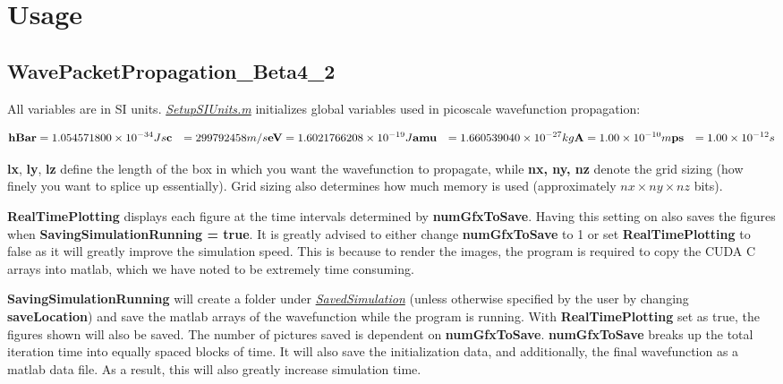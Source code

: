\documentclass[11pt,letterpaper]{article}
\renewcommand{\\}{\bigskip}
\begin{document}
\section{Usage}

\subsection{WavePacketPropagation\_Beta4\_2} 

All variables are in SI units. \underline{\textit{SetupSIUnits.m}} initializes global variables used in picoscale wavefunction propagation:

\begin{align*}
    \textbf{hBar} &= 1.054571800 \times 10^{-34} Js\\
    \textbf{c} &= 299792458 m/s\\
    \textbf{eV} &= 1.6021766208 \times 10^{-19} J\\
    \textbf{amu} &=  1.660539040 \times 10^{-27} kg\\
    \textbf{A} &= 1.00 \times 10^{-10} m\\
    \textbf{ps} &= 1.00 \times 10^{-12} s
\end{align*}

\textbf{lx}, \textbf{ly}, \textbf{lz} define the length of the box in which you want the wavefunction to propagate, while \textbf{nx, ny, nz} denote the grid sizing (how finely you want to splice up essentially). Grid sizing also determines how much memory is used (approximately $nx \times ny \times nz$ bits).\\

\textbf{RealTimePlotting} displays each figure at the time intervals determined by \textbf{numGfxToSave}. Having this setting on also saves the figures when \textbf{SavingSimulationRunning = true}. It is greatly advised to either change \textbf{numGfxToSave} to 1 or set \textbf{RealTimePlotting} to false as it will greatly improve the simulation speed. This is because to render the images, the program is required to copy the CUDA C arrays into matlab, which we have noted to be extremely time consuming.\\

\textbf{SavingSimulationRunning} will create a folder under \underline{\textit{SavedSimulation}} (unless otherwise specified by the user by changing \textbf{saveLocation}) and save the matlab arrays of the wavefunction while the program is running. With \textbf{RealTimePlotting} set as true, the figures shown will also be saved. The number of pictures saved is dependent on \textbf{numGfxToSave}. \textbf{numGfxToSave} breaks up the total iteration time into equally spaced blocks of time. It will also save the initialization data, and additionally, the final wavefunction as a matlab data file. As a result, this will also greatly increase simulation time.\\
\end{document}
